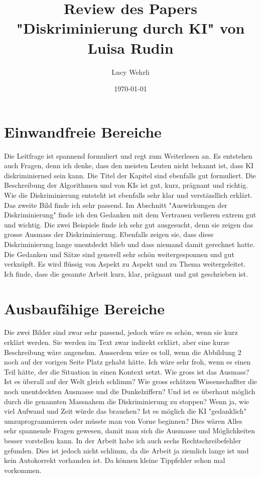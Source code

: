 \documentclass{article}
\title{Review des Papers "Diskriminierung durch KI" von Luisa Rudin}
\author{Lucy Wehrli}
\date{\today}
\begin{document}
\maketitle

\section{Einwandfreie Bereiche}
Die Leitfrage ist spannend formuliert und regt zum Weiterlesen an. Es entstehen auch Fragen, denn ich denke, dass den meisten Leuten nicht bekannt ist, dass KI diskriminierned sein kann. Die Titel der Kapitel sind ebenfalls gut formuliert. Die Beschreibung der Algorithmen und von KIs ist gut, kurz, prägnant und richtig. Wie die Diskriminierung entsteht ist ebenfalls sehr klar und verständlich erklärt. Das zweite Bild finde ich sehr passend. Im Abschnitt "Auswirkungen der Diskriminierung" finde ich den Gedanken mit dem Vertrauen verlieren extrem gut und wichtig. Die zwei Beispiele finde ich sehr gut ausgesucht, denn sie zeigen das grosse Ausmass der Diskriminierung. Ebenfalls zeigen sie, dass diese Diskriminierung lange unentdeckt blieb und dass niemand damit gerechnet hatte. Die Gedanken und Sätze sind generell sehr schön weitergesponnen und gut verknüpft. Es wird flüssig von Aspekt zu Aspekt und zu Thema weitergeleitet. Ich finde, dass die gesamte Arbeit kurz, klar, prägnant und gut geschrieben ist. 


\section{Ausbaufähige Bereiche}
Die zwei Bilder sind zwar sehr passend, jedoch wäre es schön, wenn sie kurz erklärt werden. Sie werden im Text zwar indirekt erklärt, aber eine kurze Beschreibung wäre angenehm. Ausserdem wäre es toll, wenn die Abbildung 2 noch auf der vorigen Seite Platz gehabt hätte. Ich wäre sehr froh, wenn es einen Teil hätte, der die Situation in einen Kontext setzt. Wie gross ist das Ausmass? Ist es überall auf der Welt gleich schlimm? Wie gross schätzen Wissenschaflter die noch unentdeckten Ausmasse und die Dunkelziffern? Und ist es überhaut möglich durch die genannten Massnahem die Diskriminierung zu stoppen? Wenn ja, wie viel Aufwand und Zeit würde das brauchen? Ist es möglich die KI "gedanklich" umzuprogrammieren oder müsste man von Vorne beginnen? Dies wären Alles sehr spannende Fragen gewesen, damit man sich die Ausmasse und Möglichkeiten besser vorstellen kann. In der Arbeit habe ich auch sechs Rechtschreibefehler gefunden. Dies ist jedoch nicht schlimm, da die Arbeit ja ziemlich lange ist und kein Autokorrekt vorhanden ist. Da können kleine Tippfehler schon mal vorkommen.



\printbibliography
\end{document}
